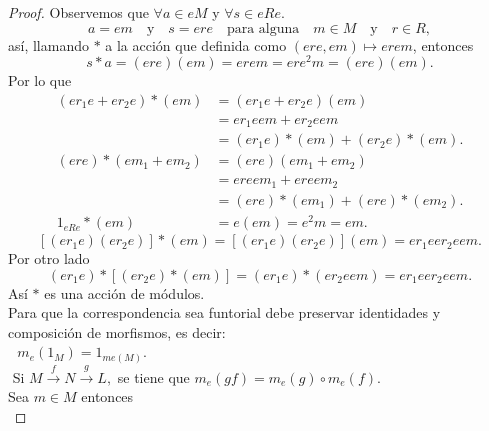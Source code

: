 \documentclass{article}
\theoremstyle{definition}
\theoremstyle{plain}
\theoremstyle{plain}
\theoremstyle{definition}
\theoremstyle{definition}
\theoremstyle{definition}
\theoremstyle{definition}
\theoremstyle{definition}
\theoremstyle{definition}
\begin{document}
\begin{enumerate}[label=\textbf{Ej \arabic*.}]
\begin{proof}
	 Observemos que $\forall a\in eM$ y $\forall s\in eRe$.
	\[a=em\quad \text{y} \quad s=ere\quad \text{para alguna} \quad m\in M\quad \text{y} \quad r\in R,\]
	así, llamando $*$ a la acción que definida como $(ere,em)\mapsto erem$, entonces 
	\[s*a=(ere)(em)=erem=ere^2m=(ere)(em).
	\]
	Por lo que 
	\begin{align*}
(er_1e+er_2e)*(em)&=(er_1e+er_2e)(em)\\
		&=er_1eem+er_2eem\\
		&=(er_1e)*(em)+(er_2e)*(em).\\
(ere)*(em_1+em_2)&= (ere)(em_1+em_2)\\
		&=ereem_1+ereem_2\\
		&=(ere)*(em_1)+(ere)*(em_2).\\
1_{eRe}*(em)&=e(em)=e^2m=em.
	\end{align*}
	\[[(er_1e)(er_2e)]*(em)=[(er_1e)(er_2e)](em)=er_1eer_2eem.\]
	Por otro lado
	\[(er_1e)*[(er_2e)*(em)]=(er_1e)*(er_2eem)=er_1eer_2eem.\]
	Así $*$ es una acción de módulos.\\
	
	 Para que la correspondencia sea funtorial debe preservar identidades y composición de morfismos, es decir:\\
	
	\,\, $m_e(1_M)=1_{me(M)}$.\\
	\,\,Si  $ M \stackrel{f}{\longrightarrow} N \stackrel{g}{\longrightarrow} L,$ se tiene que $m_e(gf)=m_e(g)\circ m_e(f)$.\\
	
	Sea $m\in M$ entonces\\
	

\end{proof}
\end{enumerate}
\end{document}
